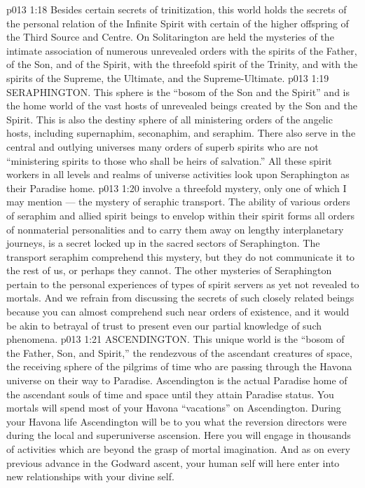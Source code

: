 \vs p013 1:18 \pc {} Besides certain secrets of trinitization, this world holds the secrets of the personal relation of the Infinite Spirit with certain of the higher offspring of the Third Source and Centre. On Solitarington are held the mysteries of the intimate association of numerous unrevealed orders with the spirits of the Father, of the Son, and of the Spirit, with the threefold spirit of the Trinity, and with the spirits of the Supreme, the Ultimate, and the Supreme\hyp{}Ultimate.
\vs p013 1:19 \bibnobreakspace SERAPHINGTON. This sphere is the “bosom of the Son and the Spirit” and is the home world of the vast hosts of unrevealed beings created by the Son and the Spirit. This is also the destiny sphere of all ministering orders of the angelic hosts, including supernaphim, seconaphim, and seraphim. There also serve in the central and outlying universes many orders of superb spirits who are not “ministering spirits to those who shall be heirs of salvation.” All these spirit workers in all levels and realms of universe activities look upon Seraphington as their Paradise home.
\vs p013 1:20 \pc {} involve a threefold mystery, only one of which I may mention --- the mystery of seraphic transport. The ability of various orders of seraphim and allied spirit beings to envelop within their spirit forms all orders of nonmaterial personalities and to carry them away on lengthy interplanetary journeys, is a secret locked up in the sacred sectors of Seraphington. The transport seraphim comprehend this mystery, but they do not communicate it to the rest of us, or perhaps they cannot. The other mysteries of Seraphington pertain to the personal experiences of types of spirit servers as yet not revealed to mortals. And we refrain from discussing the secrets of such closely related beings because you can almost comprehend such near orders of existence, and it would be akin to betrayal of trust to present even our partial knowledge of such phenomena.
\vs p013 1:21 \bibnobreakspace ASCENDINGTON. This unique world is the “bosom of the Father, Son, and Spirit,” the rendezvous of the ascendant creatures of space, the receiving sphere of the pilgrims of time who are passing through the Havona universe on their way to Paradise. Ascendington is the actual Paradise home of the ascendant souls of time and space until they attain Paradise status. You mortals will spend most of your Havona “vacations” on Ascendington. During your Havona life Ascendington will be to you what the reversion directors were during the local and superuniverse ascension. Here you will engage in thousands of activities which are beyond the grasp of mortal imagination. And as on every previous advance in the Godward ascent, your human self will here enter into new relationships with your divine self.
